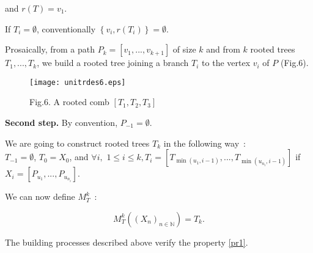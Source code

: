 \documentclass{llncs}
\begin{document}
\noindent
and $r(T) = v_1 $.

If $T_i = \emptyset $, conventionally $\left\{ {v_i ,r\left( {T_i
} \right)} \right\} = \emptyset $.


Prosaically, from a path $P_k = \left[ {v_1 ,...,v_{k + 1} }
\right]$ of size $k$ and from $k$ rooted trees $T_1 ,...,T_k $, we
build a rooted tree joining a branch $T_i $ to the vertex $v_i $
of $P$ (Fig.6).

\begin{figure}[htbp]
\centerline{\texttt{[image: unitrdes6.eps]}}
\label{fig6}
\begin{center}
Fig.6. A rooted comb $\left[ {T_1 ,T_2 ,T_3 } \right]$
\end{center}
\end{figure}

\textbf{Second step.} By convention, $P_{ - 1} = \emptyset $.

We are going to construct rooted trees $T_k $ in the following
way~:\\ $T_{ - 1} = \emptyset$, $T_0 = X_0$, and $\forall i,$ $1
\le i \le k, T_i = \left[ {T_{\min \left( {u_1 ,i - 1} \right)}
,...,T_{\min \left( {u_{n_i } ,i - 1} \right)} } \right]$ if $X_i
= \left[ {P_{u_1 } ,...,P_{u_{n_i } } } \right]$.

We can now define $M_T^k$~:

$$M_T^k \left( {\left( {X_n } \right)_{n \in \mathbb{N}} } \right)
= T_k.$$





\begin{lemma} The building processes described above verify the
property \ref{pr1}.
\end{lemma}
\end{document}
